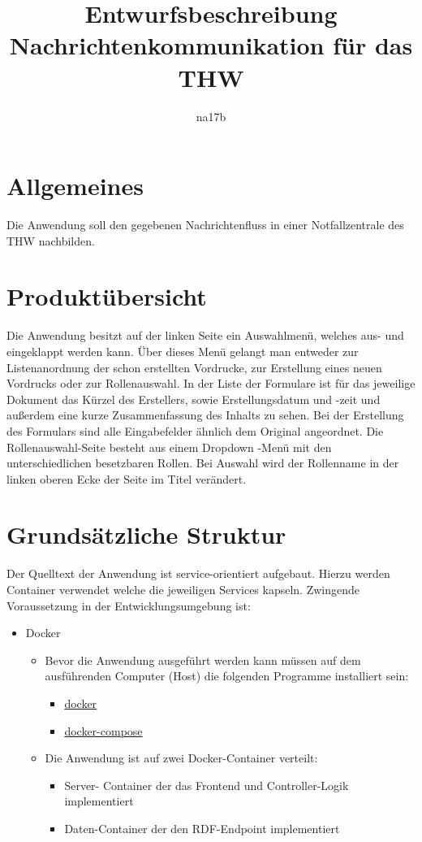 \documentclass[a4paper,11pt,oneside, titlepage]{article}
\title{Entwurfsbeschreibung\\Nachrichtenkommunikation für das THW}
\author{na17b}
\date{}
\begin{document}
\maketitle


\tableofcontents


\newpage


\section{Allgemeines}
Die Anwendung soll den gegebenen Nachrichtenfluss in einer Notfallzentrale des THW nachbilden.
\section{Produktübersicht}
Die Anwendung besitzt auf der linken Seite ein Auswahlmenü, welches aus- und eingeklappt werden kann. Über dieses Menü gelangt man entweder zur Listenanordnung der schon erstellten Vordrucke, zur Erstellung eines neuen Vordrucks oder zur Rollenauswahl. In der Liste der Formulare ist für das jeweilige Dokument das Kürzel des Erstellers, sowie Erstellungsdatum und -zeit und außerdem eine kurze Zusammenfassung des Inhalts zu sehen. Bei der Erstellung des Formulars sind alle Eingabefelder ähnlich dem Original angeordnet. Die Rollenauswahl-Seite besteht aus einem Dropdown -Menü mit den unterschiedlichen besetzbaren Rollen. Bei Auswahl wird der Rollenname in der linken oberen Ecke der Seite im Titel verändert.
\section{Grundsätzliche Struktur}
Der Quelltext der Anwendung ist service-orientiert aufgebaut. Hierzu werden Container verwendet welche die jeweiligen Services kapseln. Zwingende Voraussetzung in der Entwicklungsumgebung ist: 
\begin{itemize}
	\item Docker
	\begin{itemize}
		\item Bevor die Anwendung ausgeführt werden kann müssen auf dem ausführenden Computer (Host) die folgenden Programme installiert sein:
		\begin{itemize}
			\item \href{https://www.docker.com/get-docker}{docker}
			\item \href{https://docs.docker.com/compose/}{docker-compose} 
		\end{itemize}
		\item Die Anwendung ist auf zwei Docker-Container verteilt:
		\begin{itemize}
			\item Server-
			Container der das Frontend und Controller-Logik implementiert
			\item Daten-Container der den RDF-Endpoint implementiert
		\end{itemize}
		
	\end{itemize}	
\end{itemize}
\end{document}
